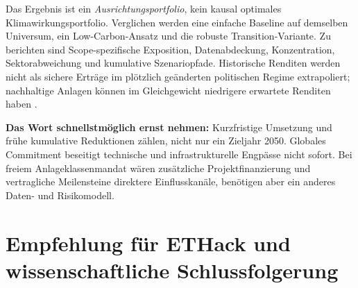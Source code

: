 \documentclass[11pt,a4paper]{article}
\begin{document}
Das Ergebnis ist ein \emph{Ausrichtungsportfolio}, kein kausal optimales Klimawirkungsportfolio. Verglichen werden eine einfache Baseline auf demselben Universum, ein Low-Carbon-Ansatz und die robuste Transition-Variante. Zu berichten sind Scope-spezifische Exposition, Datenabdeckung, Konzentration, Sektorabweichung und kumulative Szenariopfade. Historische Renditen werden nicht als sichere Erträge im plötzlich geänderten politischen Regime extrapoliert; nachhaltige Anlagen können im Gleichgewicht niedrigere erwartete Renditen haben \cite{pastor2021}.

\textbf{Das Wort \glqq schnellstmöglich\grqq{} ernst nehmen:} Kurzfristige Umsetzung und frühe kumulative Reduktionen zählen, nicht nur ein Zieljahr 2050. Globales Commitment beseitigt technische und infrastrukturelle Engpässe nicht sofort. Bei freiem Anlageklassenmandat wären zusätzliche Projektfinanzierung und vertragliche Meilensteine direktere Einflusskanäle, benötigen aber ein anderes Daten- und Risikomodell.

\section{Empfehlung für ETHack und wissenschaftliche Schlussfolgerung}
\end{document}
